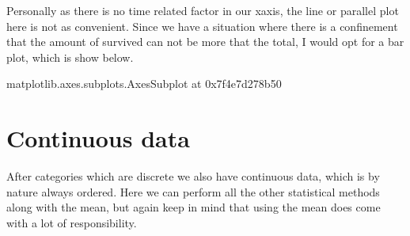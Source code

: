 \documentclass[letterpaper,10pt,english]{jupyterBook}
\begin{document}
\noindent{}

\sphinxAtStartPar
Personally as there is no time related factor in our x\sphinxhyphen{}axis, the line or parallel plot here is not as convenient.
Since we have a situation where there is a confinement that the amount of survived can not be more that the total, I would opt for a bar plot, which is show below.

\begin{sphinxVerbatim}[commandchars=\\\{\}]
        
     \PYG{p}{[}\PYG{p}{]}   
\end{sphinxVerbatim}

\begin{sphinxVerbatim}[commandchars=\\\{\}]
\PYGZlt{}matplotlib.axes.\PYGZus{}subplots.AxesSubplot at 0x7f4e7d278b50\PYGZgt{}
\end{sphinxVerbatim}

\noindent{}


\section{Continuous data}
\label{\detokenize{c5_data_exploration/univariate_analysis:continuous-data}}
\sphinxAtStartPar
After categories which are discrete we also have continuous data, which is by nature always ordered. Here we can perform all the other statistical methods along with the mean, but again keep in mind that using the mean does come with a lot of responsibility.

\begin{sphinxVerbatim}[commandchars=\\\{\}]
\PYG{p}{[}\PYG{p}{]}
\end{sphinxVerbatim}
\end{document}
